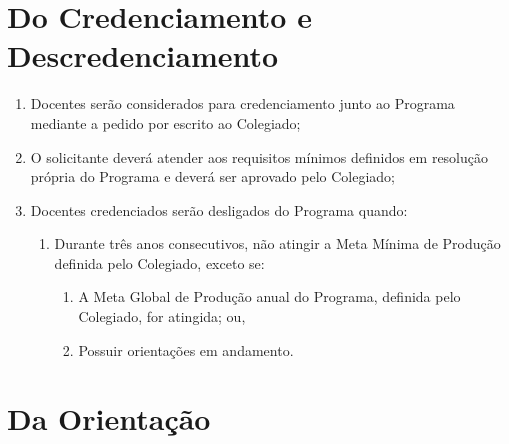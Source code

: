 \documentclass{article}
\begin{document}
\section{Do Credenciamento e Descredenciamento}
\begin{enumerate}
	\item Docentes serão considerados para credenciamento junto ao Programa mediante a pedido por escrito ao Colegiado;
	\item O solicitante deverá atender aos requisitos mínimos definidos em resolução própria do Programa e deverá ser aprovado pelo Colegiado;

	\item Docentes credenciados serão desligados do Programa quando:
	\begin{enumerate}
		\item Durante três anos consecutivos, não atingir a Meta Mínima de Produção definida pelo Colegiado, exceto se:
		\begin{enumerate}
			\item A Meta Global de Produção anual do Programa, definida pelo Colegiado, for atingida; ou,
			\item Possuir orientações em andamento. 
		\end{enumerate}
	\end{enumerate}

\end{enumerate}


\section{Da Orientação}
\end{document}
